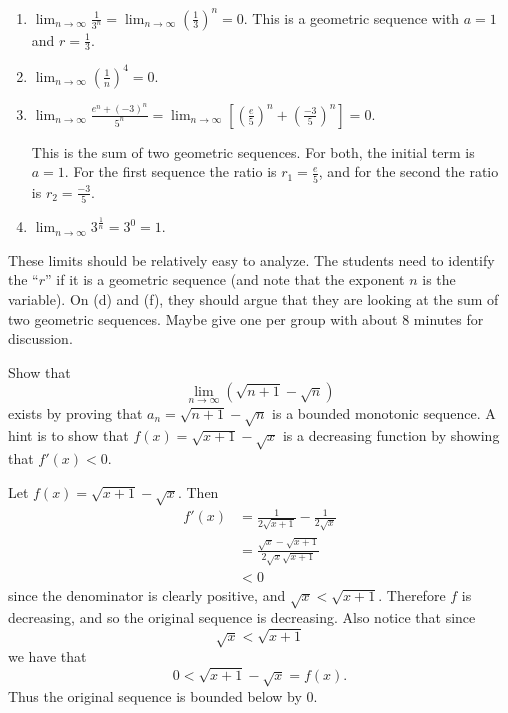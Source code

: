 \documentclass[noinstructornotes]{ximera}
\begin{document}
\begin{problem}
\begin{enumerate}
\begin{problem}
\begin{freeResponse}
\begin{enumerate}
	\item  $\lim_{n \to \infty} \frac{1}{3^n} = \lim_{n \to \infty} \left( \frac{1}{3} \right)^n = 0.$
	This is a geometric sequence with $a = 1$ and $r = \frac{1}{3}$.  
	
	\item  $\lim_{n \to \infty} \left( \frac{1}{n} \right)^4 = 0$.  
	
	\item  $\lim_{n \to \infty} \frac{e^n + (-3)^n}{5^n} = \lim_{n \to \infty} \left[ \left( \frac{e}{5} \right)^n + \left( \frac{-3}{5} \right)^n \right] = 0.$  
	
	This is the sum of two geometric sequences.  
	For both, the initial term is $a = 1$.  
	For the first sequence the ratio is $r_1 = \frac{e}{5}$, and for the second the ratio is $r_2 = \frac{-3}{5}$.
	
	\item  $\lim_{n \to \infty} 3^\frac{1}{n} = 3^0 = 1$.  
	
	\end{enumerate}
	\end{freeResponse}

\end{problem}

\begin{instructorNotes}
These limits should be relatively easy to analyze.  
The students need to identify the ``$r$'' if it is a geometric sequence (and note that the exponent $n$ is the variable).  
On (d) and (f), they should argue that they are looking at the sum of two geometric sequences.  
Maybe give one per group with about $8$ minutes for discussion.  
\end{instructorNotes}







\begin{problem}
Show that 
$$\lim_{n \to \infty} \left( \sqrt{n+1} - \sqrt{n} \right)$$ 
exists by proving that $a_n = \sqrt{n+1} - \sqrt{n}$ is a bounded monotonic sequence.  A hint is to show that $f(x) = \sqrt{x+1} - \sqrt{x}$ is a decreasing function by showing that $f'(x) < 0$.  
	\begin{freeResponse}
	Let $f(x) = \sqrt{x+1} - \sqrt{x}$.  Then
		\begin{align*}
		f'(x) 
		&= \frac{1}{2 \sqrt{x+1}} - \frac{1}{2 \sqrt{x}}  \\
		&= \frac{\sqrt{x} - \sqrt{x+1}}{2 \sqrt{x}\sqrt{x+1}}  \\
		&< 0
		\end{align*}
	since the denominator is clearly positive, and $\sqrt{x} < \sqrt{x+1}$.
	Therefore $f$ is decreasing, and so the original sequence is decreasing.  
	Also notice that since 
	$$\sqrt{x} < \sqrt{x+1}$$
	we have that 
	$$0 < \sqrt{x+1} - \sqrt{x} = f(x).$$
	Thus the original sequence is bounded below by $0$.  \


\end{freeResponse}
\end{problem}
\end{enumerate}
\end{problem}
\end{document}
